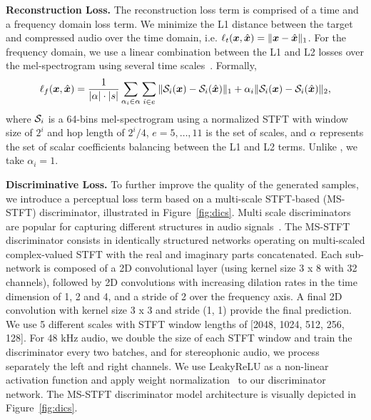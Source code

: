 {\noindent \bf Reconstruction Loss.}
The reconstruction loss term is comprised of a time and a frequency domain loss term. We minimize the L1 distance between the target and compressed audio over the time domain, i.e. $\ell_{t}(\bm{x}, \hat{\bm{x}}) = \|\bm{x} - \hat{\bm{x}}\|_1$. For the frequency domain, we use a linear combination between the L1 and L2 losses over the mel-spectrogram using several time scales~\citep{yamamoto2020parallel, gritsenko2020spectral}. 
Formally, 
\begin{equation}
    \ell_{f}(\bm{x}, \hat{\bm{x}}) = \frac{1}{|\alpha|\cdot |s|}\sum_{\alpha_i \in \alpha} \sum_{i \in e} \|\mathcal{S}_i(\bm{x}) - \mathcal{S}_i(\hat{\bm{x}})\|_1 + \alpha_i \|\mathcal{S}_i(\bm{x}) - \mathcal{S}_i(\hat{\bm{x}})\|_2,
    \label{eq:msspec}
\end{equation}
where $\mathcal{S}_i$ is a 64-bins mel-spectrogram using a normalized STFT with window size of $2^i$ and hop length of $2^i/4$, $e = {5, \ldots, 11}$ is the set of scales, and $\alpha$ represents the set of scalar coefficients balancing between the L1 and L2 terms. Unlike \citet{gritsenko2020spectral}, we take $\alpha_i = 1$.

{\noindent \bf Discriminative Loss.}
To further improve the quality of the generated samples, we introduce a perceptual loss term based on a multi-scale STFT-based (MS-STFT) discriminator, illustrated in Figure~\ref{fig:dics}.
Multi scale discriminators are popular for capturing different structures in audio signals~\citep{melgan, hifigan, you2021gan}. The MS-STFT discriminator consists in identically structured networks operating on multi-scaled complex-valued STFT with the real and imaginary parts concatenated. 
Each sub-network is composed of a 2D convolutional layer (using kernel size 3 x 8 with 32 channels), followed by 2D convolutions with increasing dilation rates in the time dimension of 1, 2 and 4, and a stride of 2 over the frequency axis. A final 2D convolution with kernel size 3 x 3 and stride (1, 1) provide the final prediction. We use 5 different scales with STFT window lengths of [2048, 1024, 512, 256, 128]. 
For 48 kHz audio, we double the size of each STFT window and train the discriminator every two batches, and for stereophonic audio, we process separately the left and right channels. We use LeakyReLU as a non-linear activation function and apply weight normalization~\citep{salimans2016weight} to our discriminator network. The MS-STFT discriminator model architecture is visually depicted in Figure~\ref{fig:dics}. 

